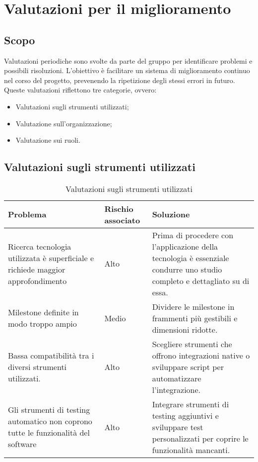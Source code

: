 

\section{Valutazioni per il miglioramento}
\label{sec:Valutazioni per il miglioramento}


\subsection{Scopo}
Valutazioni periodiche sono svolte da parte del gruppo per identificare problemi e possibili
risoluzioni. L’obiettivo è facilitare un sistema di miglioramento continuo nel corso del progetto, 
prevenendo la ripetizione degli stessi errori in futuro. 
Queste valutazioni riflettono tre categorie, ovvero:
\begin{itemize}
    \item Valutazioni sugli strumenti utilizzati;
    \item Valutazione sull'organizzazione;
    \item Valutazione sui ruoli.
\end{itemize}

\subsection{Valutazioni sugli strumenti utilizzati}
\begin{table}[h!]
    \centering
    \begin{tabularx}{\textwidth}{|X|p{}|X|}\hline
    \rowcolor[HTML]{FFD700}
    \textbf{Problema} & \textbf{Rischio associato} & \textbf{Soluzione} \\ 
    \hline
    Ricerca tecnologia utilizzata è superficiale e richiede maggior approfondimento 
    & Alto & Prima di procedere con l'applicazione della tecnologia è essenziale condurre
    uno studio completo e dettagliato su di essa. \\ 
    \hline
    Milestone definite in modo troppo ampio & Medio 
    & Dividere le milestone in frammenti più gestibili e dimensioni ridotte. \\ 
    \hline
    Bassa compatibilità tra i diversi strumenti utilizzati. & Alto &
    Scegliere strumenti che offrono integrazioni native o sviluppare script per automatizzare l'integrazione. \\ 
    \hline
    Gli strumenti di testing automatico non coprono tutte le funzionalità del software & Alto &
    Integrare strumenti di testing aggiuntivi e sviluppare test personalizzati per coprire le funzionalità mancanti. \\
    \hline
    \end{tabularx}
    \caption{Valutazioni sugli strumenti utilizzati}
    \label{tab:valutazioni_strumenti}
\end{table}

